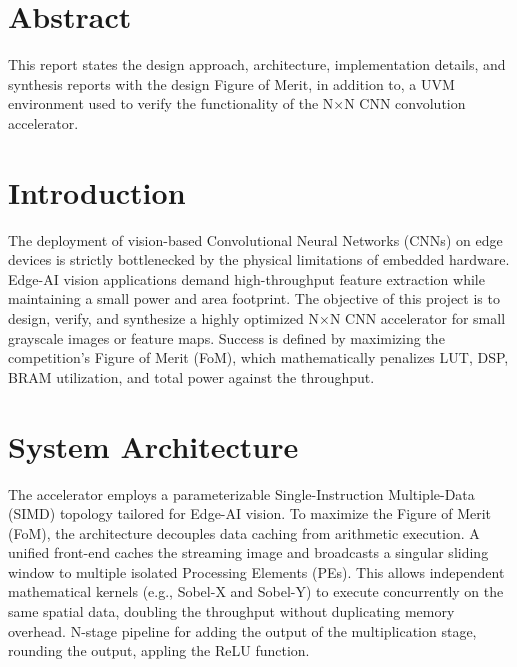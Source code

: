 \documentclass[12pt, a4paper]{article}
\begin{document}
\setcounter{page}{1} %
\section*{Abstract}
This report states the design approach, architecture, implementation details, and synthesis reports with the design Figure of Merit, in addition to, a UVM environment used to verify the functionality of the N×N CNN convolution accelerator.



\newpage
\tableofcontents
\newpage


\section{Introduction}
The deployment of vision-based Convolutional Neural Networks (CNNs) on edge devices is strictly bottlenecked by the physical limitations of embedded hardware. Edge-AI vision applications demand high-throughput feature extraction while maintaining a small power and area footprint. The objective of this project is to design, verify, and synthesize a highly optimized N×N CNN accelerator for small grayscale images or feature maps. Success is defined by maximizing the competition's Figure of Merit (FoM), which mathematically penalizes LUT, DSP, BRAM utilization, and total power against the throughput.

\newpage

\section{System Architecture}
The accelerator employs a parameterizable Single-Instruction Multiple-Data (SIMD) topology tailored for Edge-AI vision. To maximize the Figure of Merit (FoM), the architecture decouples data caching from arithmetic execution. A unified front-end caches the streaming image and broadcasts a singular sliding window to multiple isolated Processing Elements (PEs). This allows independent mathematical kernels (e.g., Sobel-X and Sobel-Y) to execute concurrently on the same spatial data, doubling the throughput without duplicating memory overhead. N-stage pipeline for adding the output of the multiplication stage, rounding the output, appling the ReLU function.
\end{document}
